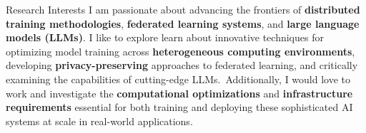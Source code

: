 
\begin{rSection}{Research Interests}
    I am passionate about advancing the frontiers of \textbf{distributed training methodologies}, 
    \textbf{federated learning systems}, and \textbf{large language models (LLMs)}. I like to explore  learn about
    innovative techniques for optimizing model training across \textbf{heterogeneous computing environments}, 
    developing \textbf{privacy-preserving} approaches to federated learning, and critically examining 
    the capabilities of cutting-edge LLMs.\ Additionally, 
    I would love to work and investigate the \textbf{computational optimizations} and \textbf{infrastructure requirements} essential 
    for both training and deploying these sophisticated AI systems at scale in real-world applications.
\end{rSection}